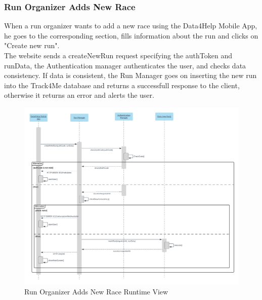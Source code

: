 \subsubsection{Run Organizer Adds New Race}
When a run organizer wants to add a new race using the Data4Help Mobile App, he goes to the corresponding section, fills information about the run and clicks on "Create new run".\\
The website sends a createNewRun request specifying the authToken and runData, the Authentication manager authenticates the user, and checks data consistency.
If data is consistent, the Run Manager goes on inserting the new run into the Track4Me database and returns a successfull response to the client, otherwise it returns an error and alerts the user.
\begin{figure}[H]
	\includegraphics[width=\textwidth,height=\textheight,keepaspectratio]{assets/flowCharts/RunOrganizerAddsNewRace.pdf}
	\caption{Run Organizer Adds New Race Runtime View}
	\label{fig:RunOrganizerAddsNewRace}
\end{figure}



